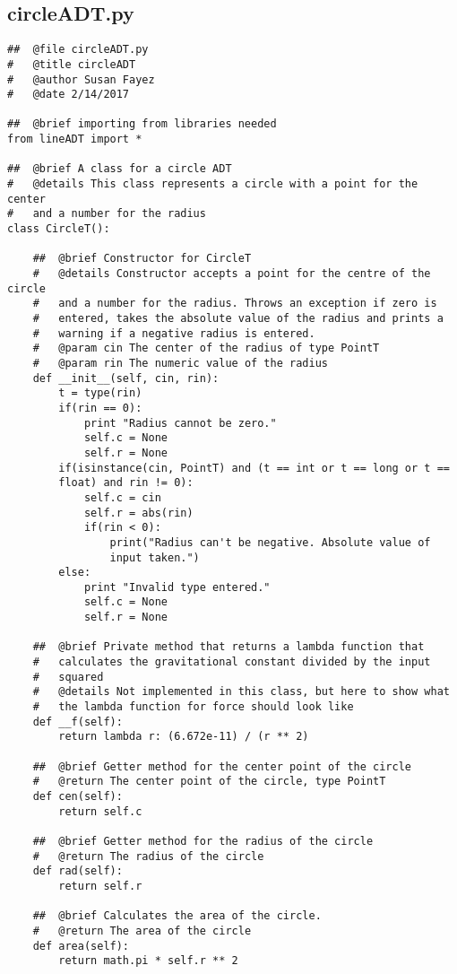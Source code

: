 \documentclass{article}
\begin{document}
\subsection{circleADT.py}
\begin{lstlisting}
##  @file circleADT.py
#   @title circleADT
#   @author Susan Fayez
#   @date 2/14/2017

##  @brief importing from libraries needed
from lineADT import *

##  @brief A class for a circle ADT
#   @details This class represents a circle with a point for the center  
#   and a number for the radius
class CircleT():
    
    ##  @brief Constructor for CircleT
    #   @details Constructor accepts a point for the centre of the circle  
    #   and a number for the radius. Throws an exception if zero is 
    #   entered, takes the absolute value of the radius and prints a 
    #   warning if a negative radius is entered.
    #   @param cin The center of the radius of type PointT
    #   @param rin The numeric value of the radius
    def __init__(self, cin, rin):
        t = type(rin)
        if(rin == 0):
            print "Radius cannot be zero."
            self.c = None
            self.r = None
        if(isinstance(cin, PointT) and (t == int or t == long or t == 
        float) and rin != 0):
            self.c = cin
            self.r = abs(rin)
            if(rin < 0):
                print("Radius can't be negative. Absolute value of 
                input taken.")
        else:
            print "Invalid type entered."
            self.c = None
            self.r = None
    
    ##  @brief Private method that returns a lambda function that 
    #   calculates the gravitational constant divided by the input 
    #   squared
    #   @details Not implemented in this class, but here to show what 
    #   the lambda function for force should look like
    def __f(self):
        return lambda r: (6.672e-11) / (r ** 2)
    
    ##  @brief Getter method for the center point of the circle 
    #   @return The center point of the circle, type PointT
    def cen(self):
        return self.c

    ##  @brief Getter method for the radius of the circle 
    #   @return The radius of the circle
    def rad(self):
        return self.r

    ##  @brief Calculates the area of the circle.
    #   @return The area of the circle
    def area(self):
        return math.pi * self.r ** 2
    

\end{lstlisting}
\end{document}

